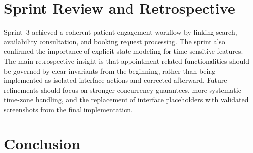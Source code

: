 \documentclass[a4paper,12pt]{report}
\begin{document}

\section{Sprint Review and Retrospective}
\label{sec:sprint3-review}

Sprint~3 achieved a coherent patient engagement workflow by linking search, availability consultation, and booking request processing. The sprint also confirmed the importance of explicit state modeling for time-sensitive features. The main retrospective insight is that appointment-related functionalities should be governed by clear invariants from the beginning, rather than being implemented as isolated interface actions and corrected afterward. Future refinements should focus on stronger concurrency guarantees, more systematic time-zone handling, and the replacement of interface placeholders with validated screenshots from the final implementation.

\section{Conclusion}
\label{sec:sprint3-conclusion}
\end{document}
